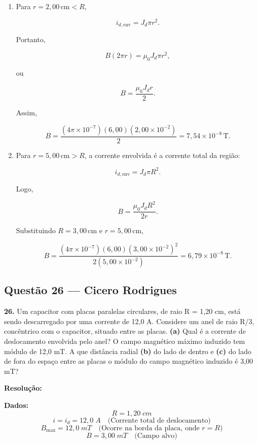 \documentclass[12pt,a4paper]{article}
\begin{document}
\begin{enumerate}
    \item[(a)] Para \(r=2{,}00\,\text{cm}<R\),

    \[
    i_{d,\text{env}}=J_d\pi r^2.
    \]

    Portanto,

    \[
    B(2\pi r)=\mu_0J_d\pi r^2,
    \]

    ou

    \[
    B=\frac{\mu_0J_dr}{2}.
    \]

    Assim,

    \[
    B=
    \frac{(4\pi\times 10^{-7})(6{,}00)(2{,}00\times 10^{-2})}{2}
    =
    7{,}54\times 10^{-8}\,\text{T}.
    \]

    \item[(b)] Para \(r=5{,}00\,\text{cm}>R\), a corrente envolvida é a
    corrente total da região:

    \[
    i_{d,\text{env}}=J_d\pi R^2.
    \]

    Logo,

    \[
    B=
    \frac{\mu_0J_dR^2}{2r}.
    \]

    Substituindo \(R=3{,}00\,\text{cm}\) e \(r=5{,}00\,\text{cm}\),

    \[
    B=
    \frac{(4\pi\times 10^{-7})(6{,}00)(3{,}00\times 10^{-2})^2}
    {2(5{,}00\times 10^{-2})}
    =
    6{,}79\times 10^{-8}\,\text{T}.
    \]
\end{enumerate}

\subsection{Questão 26 — Cicero Rodrigues}

\textbf{26. }\normalfont Um capacitor com placas paralelas circulares, de raio R = 1,20 cm, está sendo descarregado por uma corrente de 12,0 A. Considere um anel de raio R/3, concêntrico com o capacitor, situado entre as placas. \textbf{(a)} Qual é a corrente de deslocamento envolvida pelo anel? O campo magnético máximo induzido tem módulo de 12,0 mT. A que distância radial \textbf{(b)} do lado de dentro e \textbf{(c)} do lado de fora do espaço entre as placas o módulo do campo magnético induzido é 3,00 mT?

\textbf{Resolução:}
\vspace{0.3cm}

\textbf{Dados:}
\[R = 1,20\;cm\]
\[i = i_d = 12,0\;A \quad \text{(Corrente total de deslocamento)}\]
\[B_{\max} = 12,0\;mT \quad \text{(Ocorre na borda da placa, onde } r = R \text{)}\]
\[B = 3,00\;mT \quad \text{(Campo alvo)}\]
\end{document}
